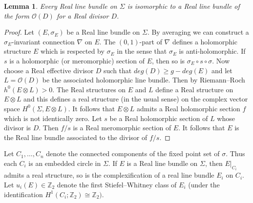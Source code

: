 \documentclass{amsart}
\newtheorem{lemma}[theorem]{Lemma}
\theoremstyle{definition}
\theoremstyle{remark}
\numberwithin{equation}{section}
\begin{document}
\begin{lemma}\label{lem:rdivgen}
Every Real line bundle on $\Sigma$ is isomorphic to a Real line bundle of the form $\mathcal{O}(D)$ for a Real divisor $D$.
\end{lemma}
\begin{proof}
Let $(E, \sigma_E)$ be a Real line bundle on $\Sigma$. By averaging we can construct a $\sigma_E$-invariant connection $\nabla$ on $E$. The $(0,1)$-part of $\nabla$ defines a holomorphic structure $E$ which is respected by $\sigma_E$ in the sense that $\sigma_E$ is anti-holomorphic. If $s$ is a holomorphic (or meromorphic) section of $E$, then so is $\sigma_E \circ s \circ \sigma$. Now choose a Real effective divisor $D$ such that $deg(D) \ge g - deg(E)$ and let $L = \mathcal{O}(D)$ be the associated holomorphic line bundle. Then by Riemann--Roch $h^0(E \otimes L) > 0$. The Real structures on $E$ and $L$ define a Real structure on $E \otimes L$ and this defines a real structure (in the usual sense) on the complex vector space $H^0(\Sigma , E \otimes L)$. It follows that $E \otimes L$ admits a Real holomorphic section $f$ which is not identically zero. Let $s$ be a Real holomorphic section of $L$ whose divisor is $D$. Then $f/s$ is a Real meromorphic section of $E$. It follows that $E$ is the Real line bundle associated to the divisor of $f/s$.
\end{proof}

Let $C_1, \dots , C_n$ denote the connected components of the fixed point set of $\sigma$. Thus each $C_i$ is an embedded circle in $\Sigma$. If $E$ is a Real line bundle on $\Sigma$, then $E|_{C_i}$ admits a real structure, so is the complexification of a real line bundle $E_i$ on $C_i$. Let $u_i(E) \in \mathbb{Z}_2$ denote the first Stiefel--Whitney class of $E_i$ (under the identification $H^1(C_i ; \mathbb{Z}_2) \cong \mathbb{Z}_2)$. 
\end{document}
